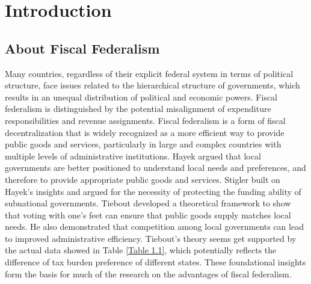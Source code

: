 
\chapter{Introduction} \label{chapter1:Introduction}

\section{About Fiscal Federalism}

Many countries, regardless of their explicit federal system in terms of political structure, face issues related to the hierarchical structure of governments, which results in an unequal distribution of political and economic powers. Fiscal federalism is distinguished by the potential misalignment of expenditure responsibilities and revenue assignments. Fiscal federalism is a form of fiscal decentralization that is widely recognized as a more efficient way to provide public goods and services, particularly in large and complex countries with multiple levels of administrative institutions. Hayek \cite{hayek2009use} argued that local governments are better positioned to understand local needs and preferences, and therefore to provide appropriate public goods and services. Stigler \cite{stigler1998tenable} built on Hayek's insights and argued for the necessity of protecting the funding ability of subnational governments. Tiebout \cite{tiebout1956pure} developed a theoretical framework to show that voting with one's feet can ensure that public goods supply matches local needs. He also demonstrated that competition among local governments can lead to improved administrative efficiency. Tiebout's theory seems get supported by the actual data showed in Table \ref*{Table 1.1}, which potentially reflects the difference of tax burden preference of different states. These foundational insights form the basis for much of the research on the advantages of fiscal federalism.
